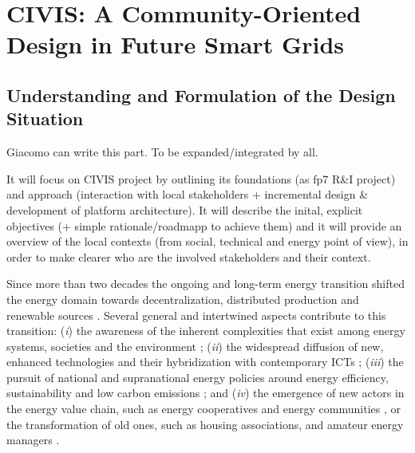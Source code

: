 \section{CIVIS: A Community-Oriented Design in Future Smart Grids}

% 
% 


\subsection{Understanding and Formulation of the Design Situation}
\begin{svgraybox}
[note by GP] Giacomo can write this part. To be expanded/integrated by all.

It will focus on CIVIS project by outlining its foundations (as fp7 R\&I project) and approach 
(interaction with local stakeholders + incremental design \& development of platform architecture). 
It will describe the inital, explicit objectives (+ simple rationale/roadmapp to achieve them) and 
it will provide an overview of the local contexts (from social, technical and energy point of view), 
in order to make clearer who are the involved stakeholders and their context.
\end{svgraybox}

Since more than two decades the ongoing and long-term energy transition shifted the energy domain
towards decentralization, distributed production and renewable sources \cite{rifkin_third_2011,sovacool_how_2016}. Several general and intertwined aspects contribute to this transition: 
(\textit{i}) the awareness of the inherent complexities that exist among energy systems, societies 
and the environment \cite{bulkeley_bringing_2012,umbach_global_2010}; (\textit{ii}) the
widespread diffusion of new, enhanced technologies and their hybridization with contemporary ICTs 
\cite{putrus_smart_2013,schick_innovating_2013}; (\textit{iii}) the pursuit of national and 
supranational energy policies around energy efficiency, sustainability and low carbon emissions 
\cite{da_graca_carvalho_eu_2012}; and (\textit{iv}) the emergence of new actors in the energy value 
chain, such as energy cooperatives and energy communities \cite{viardot_role_2013}, or the 
transformation of old ones, such as housing associations, and amateur energy managers 
\cite{hasselqvist_linking_2016}.


